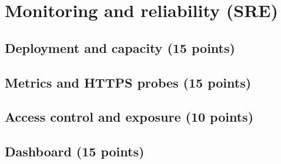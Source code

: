 \chapter{Monitoring and reliability (SRE)}


\section{Deployment and capacity (15 points)}\label{Section:sreDeployment}

\section{Metrics and HTTPS probes (15 points)}\label{Section:sreMetrics}

\section{Access control and exposure (10 points)}\label{Section:sreAccess}

\section{Dashboard (15 points)}\label{Section:sreDashboard}

